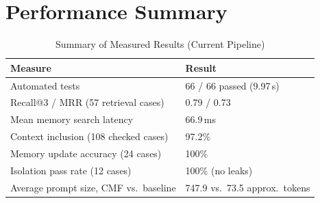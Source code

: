 \section{Performance Summary}

\begin{table}[H]
    \centering
    \small
    \caption{Summary of Measured Results (Current Pipeline)}
    \begin{tabular}{p{7.0cm} p{5.8cm}}
        \toprule
        \textbf{Measure} & \textbf{Result} \\
        \midrule
        Automated tests                         & 66 / 66 passed (9.97\,s) \\[3pt]
        Recall@3 / MRR (57 retrieval cases)     & 0.79 / 0.73 \\[3pt]
        Mean memory search latency              & 66.9\,ms \\[3pt]
        Context inclusion (108 checked cases)   & 97.2\% \\[3pt]
        Memory update accuracy (24 cases)       & 100\% \\[3pt]
        Isolation pass rate (12 cases)          & 100\% (no leaks) \\[3pt]
        Average prompt size, CMF vs.\ baseline  & 747.9 vs.\ 73.5 approx.\ tokens \\
        \bottomrule
    \end{tabular}
    \label{tab:summary}
\end{table}
